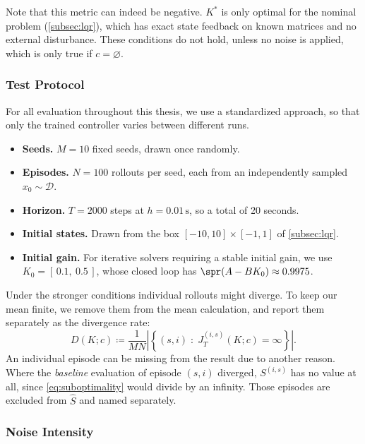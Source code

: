 Note that this metric can indeed be negative. $K^{*}$ is only optimal for
the nominal problem (\cref{subsec:lqr}), which has exact state feedback on
known matrices and no external disturbance. These conditions do not
hold, unless no noise is applied, which is only true if $c=\varnothing$.

\subsubsection{Test Protocol}
\label{subsubsec:protocol}

For all evaluation throughout this thesis, we use a standardized
approach, so that only the trained controller varies between different runs.

\begin{itemize}
    \item \textbf{Seeds.} $M = 10$ fixed seeds, drawn once randomly.
    \item \textbf{Episodes.} $N = 100$ rollouts per seed, each from an
          independently sampled $x_0 \sim \mathcal{D}$.
    \item \textbf{Horizon.} $T = 2000$ steps at $h = 0.01\,\mathrm{s}$, so a total
            of 20 seconds.
    \item \textbf{Initial states.} Drawn from the box
          $[-10, 10] \times [-1, 1]$ of \cref{subsec:lqr}.
    \item \textbf{Initial gain.} For iterative solvers requiring a
            stable initial gain, we use $K_0 = [\,0.1,\ 0.5\,]$,
            whose closed loop has $\spr(A - B K_0) \approx 0.9975$.
\end{itemize}

Under the stronger conditions individual rollouts might diverge. 
To keep our mean finite, we remove them from the mean calculation,
and report them separately as the divergence rate:
\begin{equation}
    \label{eq:divergence-rate}
    D(K; c) \coloneqq \frac{1}{M N}
    \left\lvert \left\{ (s, i) \;:\; J^{(i,s)}_T(K; c) = \infty \right\} \right\rvert .
\end{equation}
An individual episode can be missing from the result due to another reason. 
Where the \emph{baseline} evaluation of episode $(s,i)$ diverged,
$S^{(i,s)}$ has no value at all, since \eqref{eq:suboptimality} would divide 
by an infinity. Those episodes are excluded from $\hat{S}$ and named separately.

\subsubsection{Noise Intensity}
\label{subsubsec:noise-strength}

